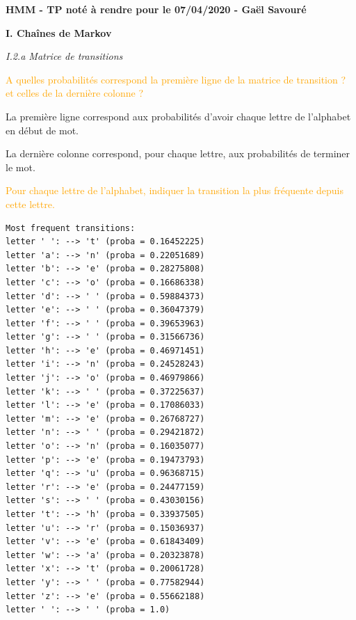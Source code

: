 \documentclass[11pt,a4paper,fleqn]{article}
\begin{document}

\textbf{HMM - TP noté à rendre pour le 07/04/2020 - Gaël Savouré}

\vspace{5mm}

\textbf{I. Chaînes de Markov}

\vspace{5mm}
\textit{I.2.a Matrice de transitions}

\vspace{5mm}
\textcolor{orange}{A quelles probabilités correspond la première ligne de la matrice de transition ? et celles de la
dernière colonne ?}

La première ligne correspond aux probabilités d'avoir chaque lettre de l'alphabet en début de mot.

La dernière colonne correspond, pour chaque lettre, aux probabilités de terminer le mot.

\vspace{5mm}
\textcolor{orange}{Pour chaque lettre de l’alphabet, indiquer la transition la plus fréquente depuis cette lettre.}

\lstset{language=Python}
\lstset{frame=lines}
\lstset{basicstyle=\footnotesize}
\begin{lstlisting}
Most frequent transitions:
letter ' ': --> 't' (proba = 0.16452225)
letter 'a': --> 'n' (proba = 0.22051689)
letter 'b': --> 'e' (proba = 0.28275808)
letter 'c': --> 'o' (proba = 0.16686338)
letter 'd': --> ' ' (proba = 0.59884373)
letter 'e': --> ' ' (proba = 0.36047379)
letter 'f': --> ' ' (proba = 0.39653963)
letter 'g': --> ' ' (proba = 0.31566736)
letter 'h': --> 'e' (proba = 0.46971451)
letter 'i': --> 'n' (proba = 0.24528243)
letter 'j': --> 'o' (proba = 0.46979866)
letter 'k': --> ' ' (proba = 0.37225637)
letter 'l': --> 'e' (proba = 0.17086033)
letter 'm': --> 'e' (proba = 0.26768727)
letter 'n': --> ' ' (proba = 0.29421872)
letter 'o': --> 'n' (proba = 0.16035077)
letter 'p': --> 'e' (proba = 0.19473793)
letter 'q': --> 'u' (proba = 0.96368715)
letter 'r': --> 'e' (proba = 0.24477159)
letter 's': --> ' ' (proba = 0.43030156)
letter 't': --> 'h' (proba = 0.33937505)
letter 'u': --> 'r' (proba = 0.15036937)
letter 'v': --> 'e' (proba = 0.61843409)
letter 'w': --> 'a' (proba = 0.20323878)
letter 'x': --> 't' (proba = 0.20061728)
letter 'y': --> ' ' (proba = 0.77582944)
letter 'z': --> 'e' (proba = 0.55662188)
letter ' ': --> ' ' (proba = 1.0)
\end{lstlisting}
\end{document}
